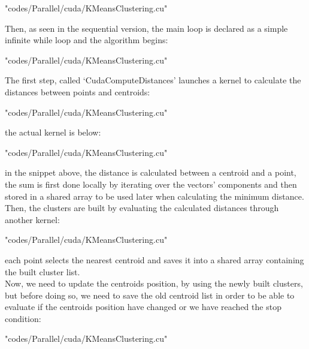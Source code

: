 \documentclass[10pt,twocolumn,letterpaper]{article}
\begin{document}
\begin{lstinputlisting}[language=C,style=CSnippetStyle,caption=CUDA Main Initialization Code,firstline=272,lastline=280]{
	"codes/Parallel/cuda/KMeansClustering.cu"}
\end{lstinputlisting}
Then, as seen in the sequential version, the main loop is declared as a simple infinite while loop and the algorithm begins:\\
\begin{lstinputlisting}[language=C,style=CSnippetStyle,caption=CUDA Main Loop,firstline=284,lastline=295]{
	"codes/Parallel/cuda/KMeansClustering.cu"}
\end{lstinputlisting}
The first step, called `CudaComputeDistances' launches a kernel to calculate the distances between points and centroids:
\begin{lstinputlisting}[language=C,style=CSnippetStyle,caption=CUDA Distance Calculator Kernel Launcher,firstline=132,lastline=141]{
	"codes/Parallel/cuda/KMeansClustering.cu"}
\end{lstinputlisting}
the actual kernel is below:\\
\begin{lstinputlisting}[language=C,style=CSnippetStyle,caption=CUDA Distance Calculator Kernel,firstline=81,lastline=103]{
	"codes/Parallel/cuda/KMeansClustering.cu"}
\end{lstinputlisting}
in the snippet above, the distance is calculated between a centroid and a point, the sum is first done locally by iterating over the 
vectors' components and then stored in a shared array to be used later when calculating the minimum distance.\\
Then, the clusters are built by evaluating the calculated distances through another kernel:\\
\begin{lstinputlisting}[language=C,style=CSnippetStyle,caption=CUDA Cluster Builder Kernel,firstline=60,lastline=79]{
	"codes/Parallel/cuda/KMeansClustering.cu"}
\end{lstinputlisting}
each point selects the nearest centroid and saves it into a shared array containing the built cluster list.\\
Now, we need to update the centroids position, by using the newly built clusters, but before doing so, we need to save the old centroid 
list in order to be able to evaluate if the centroids position have changed or we have reached the stop condition:\\
\begin{lstinputlisting}[language=C,style=CSnippetStyle,caption=CUDA Centroid List Backup,firstline=287,lastline=287]{
	"codes/Parallel/cuda/KMeansClustering.cu"}
\end{lstinputlisting}
\end{document}
